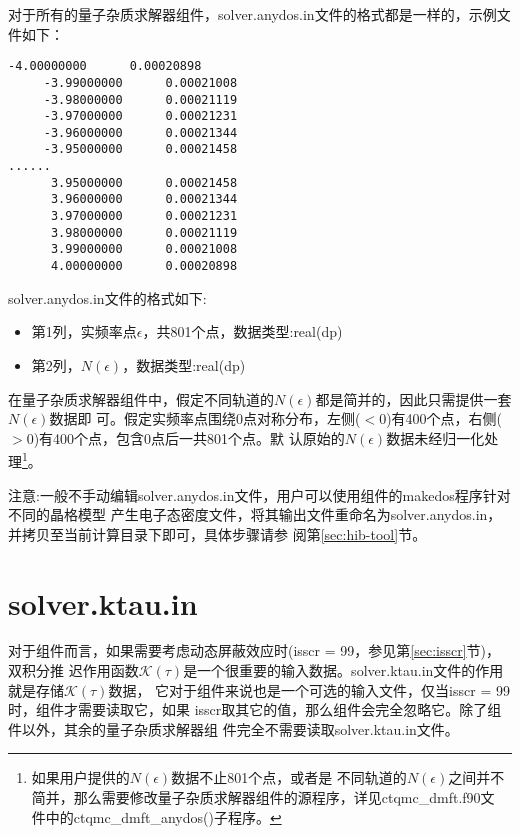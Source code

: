 对于所有的量子杂质求解器组件，solver.anydos.in文件的格式都是一样的，示例文件如下：

\begin{lstlisting}[frame=single]
     -4.00000000      0.00020898
     -3.99000000      0.00021008
     -3.98000000      0.00021119
     -3.97000000      0.00021231
     -3.96000000      0.00021344
     -3.95000000      0.00021458
......
      3.95000000      0.00021458
      3.96000000      0.00021344
      3.97000000      0.00021231
      3.98000000      0.00021119
      3.99000000      0.00021008
      4.00000000      0.00020898
\end{lstlisting}

solver.anydos.in文件的格式如下:
\begin{itemize}
\item 第1列，实频率点$\epsilon$，共801个点，数据类型:real(dp)
\item 第2列，$N(\epsilon)$，数据类型:real(dp)
\end{itemize}

在量子杂质求解器组件中，假定不同轨道的$N(\epsilon)$都是简并的，因此只需提供一套$N(\epsilon)$数据即
可。假定实频率点围绕0点对称分布，左侧($<0$)有400个点，右侧($>0$)有400个点，包含0点后一共801个点。默
认原始的$N(\epsilon)$数据未经归一化处理\footnote{如果用户提供的$N(\epsilon)$数据不止801个点，或者是
不同轨道的$N(\epsilon)$之间并不简并，那么需要修改量子杂质求解器组件的源程序，详见ctqmc\_dmft.f90文
件中的ctqmc\_dmft\_anydos()子程序。}。

注意:一般不手动编辑solver.anydos.in文件，用户可以使用{\hibiscus}组件的makedos程序针对不同的晶格模型
产生电子态密度文件，将其输出文件重命名为solver.anydos.in，并拷贝至当前计算目录下即可，具体步骤请参
阅第\ref{sec:hib-tool}节。

\section{solver.ktau.in}
\label{sec:ski}

对于{\narcissus}组件而言，如果需要考虑动态屏蔽效应时(isscr = 99，参见第\ref{sec:isscr}节)，双积分推
迟作用函数$\mathcal{K}(\tau)$是一个很重要的输入数据。solver.ktau.in文件的作用就是存储$\mathcal{K}(\tau)$数据，
它对于{\narcissus}组件来说也是一个可选的输入文件，仅当isscr = 99时，{\narcissus}组件才需要读取它，如果
isscr取其它的值，那么{\narcissus}组件会完全忽略它。除了{\narcissus}组件以外，其余的量子杂质求解器组
件完全不需要读取solver.ktau.in文件。


